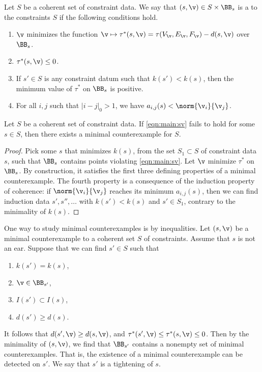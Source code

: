 \begin{definition}
  Let $S$ be a coherent set of constraint data.  We say that
  $(s,\v)\in S\times\BB_s$ is a  to
  the constraints $S$ if the following conditions hold.
\begin{enumerate}
\item $\v$ minimizes the function $\v\mapsto
  \tau^*(s,\v)=\tau(V_\v,E_\v,F_\v)-d(s,\v)$ over $\BB_s$.
\item  $\tau^*(s,\v)\le 0$.
\item If $s'\in S$ is any constraint datum such that $k(s')<k(s)$, then the
minimum value of $\tau^*$ on $\BB_s$ is positive.
\item For all $i,j$ such that $|i-j|_0>1$, we have $a_{i,j}(s) < \norm{\v_i}{\v_j}$.
\end{enumerate}
\end{definition}

\begin{lemma}
Let $S$ be a coherent set of constraint data.
If \eqref{eqn:main:sv} fails to hold for some $s\in S$, 
then there exists a minimal counterexample for $S$.
\end{lemma}

\begin{proof}
  Pick some $s$ that minimizes $k(s)$, from the set $S_1\subset S$ of
  constraint data $s$, such that $\BB_s$ contains points violating
  \eqref{eqn:main:sv}.  Let $\v$ minimize $\tau^*$ on $\BB_s$.  By
  construction, it satisfies the first three defining properties of a
  minimal counterexample.  The fourth property is a consequence of the
  induction property of coherence: if $\norm{\v_i}{\v_j}$ reaches its
  minimum $a_{i,j}(s)$, then we can find induction data
  $s',s'',\ldots$ with $k(s')<k(s)$ and $s'\in S_1$, contrary to the
  minimality of $k(s)$.
\end{proof}

\begin{remark}  
  One way to study minimal counterexamples is by
   inequalities.  Let $(s,\v)$ be a minimal
  counterexample to a coherent set $S$ of constraints.  Assume that
  $s$ is not an ear.  Suppose that we can find $s'\in S$ such that
\begin{enumerate}
\item $k(s')=k(s)$, 
\item $\v\in \BB_{s'}$, 
\item $I(s')\subset I(s)$,
\item $d(s')\ge d(s)$.
\end{enumerate}
It follows that $d(s',\v)\ge d(s,\v)$, and $\tau^*(s',\v)\le \tau^*(s,\v)\le0$.
Then by the minimality of $(s,\v)$, we find that $\BB_{s'}$ contains
a nonempty set of minimal counterexamples. 
That is, the existence of a minimal counterexample can be detected on $s'$.
We say that $s'$ is a tightening
of $s$.  
\end{remark}

